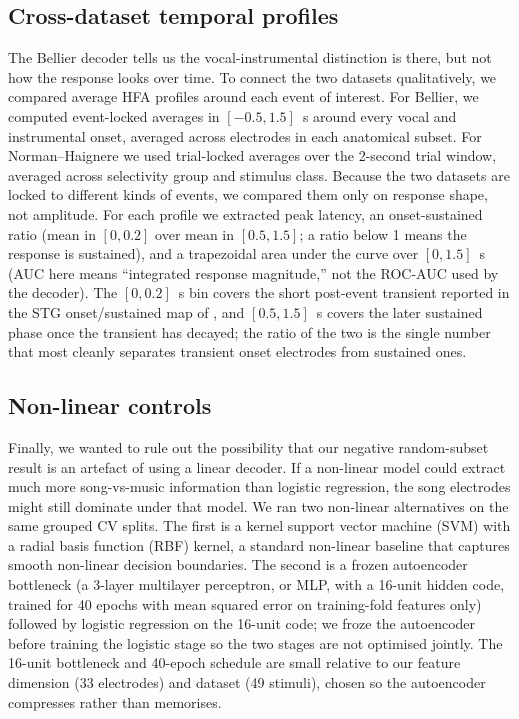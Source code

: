 \documentclass[11pt]{article}
\begin{document}
\subsection{Cross-dataset temporal profiles}
The Bellier decoder tells us the vocal-instrumental distinction is there, but not how the response looks over time. To connect the two datasets qualitatively, we compared average HFA profiles around each event of interest. For Bellier, we computed event-locked averages in $[-0.5, 1.5]$~s around every vocal and instrumental onset, averaged across electrodes in each anatomical subset. For Norman--Haignere we used trial-locked averages over the 2-second trial window, averaged across selectivity group and stimulus class. Because the two datasets are locked to different kinds of events, we compared them only on response shape, not amplitude. For each profile we extracted peak latency, an onset-sustained ratio (mean in $[0, 0.2]$ over mean in $[0.5, 1.5]$; a ratio below 1 means the response is sustained), and a trapezoidal area under the curve over $[0, 1.5]$~s (AUC here means ``integrated response magnitude,'' not the ROC-AUC used by the decoder). The $[0, 0.2]$~s bin covers the short post-event transient reported in the STG onset/sustained map of \citet{Hamilton2018}, and $[0.5, 1.5]$~s covers the later sustained phase once the transient has decayed; the ratio of the two is the single number that most cleanly separates transient onset electrodes from sustained ones.

\subsection{Non-linear controls}\label{sec:methods:nonlinear}
Finally, we wanted to rule out the possibility that our negative random-subset result is an artefact of using a linear decoder. If a non-linear model could extract much more song-vs-music information than logistic regression, the song electrodes might still dominate under that model. We ran two non-linear alternatives on the same grouped CV splits. The first is a kernel support vector machine (SVM) with a radial basis function (RBF) kernel, a standard non-linear baseline that captures smooth non-linear decision boundaries. The second is a frozen autoencoder bottleneck (a 3-layer multilayer perceptron, or MLP, with a 16-unit hidden code, trained for 40 epochs with mean squared error on training-fold features only) followed by logistic regression on the 16-unit code; we froze the autoencoder before training the logistic stage so the two stages are not optimised jointly. The 16-unit bottleneck and 40-epoch schedule are small relative to our feature dimension (33 electrodes) and dataset (49 stimuli), chosen so the autoencoder compresses rather than memorises.
\end{document}
